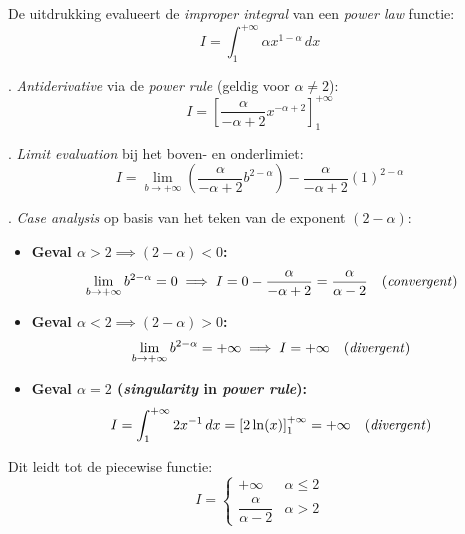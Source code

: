 \documentclass{article}
\begin{document}
\noindent De uitdrukking evalueert de \textit{improper integral} van een \textit{power law} functie:
\begin{equation*}
I = \int_{1}^{+\infty} \alpha x^{1-\alpha} \, dx
\end{equation*}

. \textit{Antiderivative} via de \textit{power rule} (geldig voor $\alpha \neq 2$):
\begin{equation*}
I = \left[ \frac{\alpha}{-\alpha + 2} x^{-\alpha + 2} \right]_{1}^{+\infty}
\end{equation*}

. \textit{Limit evaluation} bij het boven- en onderlimiet:
\begin{equation*}
I = \lim_{b \to +\infty} \left( \frac{\alpha}{-\alpha + 2} b^{2-\alpha} \right) - \frac{\alpha}{-\alpha + 2} (1)^{2-\alpha}
\end{equation*}

. \textit{Case analysis} op basis van het teken van de exponent $(2 - \alpha)$:
\begin{itemize}
    \item \textbf{Geval $\alpha > 2 \implies (2 - \alpha) < 0$:}
    \begin{equation*}
    \lim_{b \to +\infty} b^{2-\alpha} = 0 \implies I = 0 - \frac{\alpha}{-\alpha + 2} = \frac{\alpha}{\alpha - 2} \quad (\text{\textit{convergent}})
    \end{equation*}

    \item \textbf{Geval $\alpha < 2 \implies (2 - \alpha) > 0$:}
    \begin{equation*}
    \lim_{b \to +\infty} b^{2-\alpha} = +\infty \implies I = +\infty \quad (\text{\textit{divergent}})
    \end{equation*}

    \item \textbf{Geval $\alpha = 2$ (\textit{singularity} in \textit{power rule}):}
    \begin{equation*}
    I = \int_{1}^{+\infty} 2 x^{-1} \, dx = \left[ 2 \ln(x) \right]_{1}^{+\infty} = +\infty \quad (\text{\textit{divergent}})
    \end{equation*}
\end{itemize}

\noindent Dit leidt tot de piecewise functie:
\begin{equation*}
I = \begin{cases}
+\infty & \alpha \le 2 \\
\dfrac{\alpha}{\alpha - 2} & \alpha > 2
\end{cases}
\end{equation*}
\end{document}
